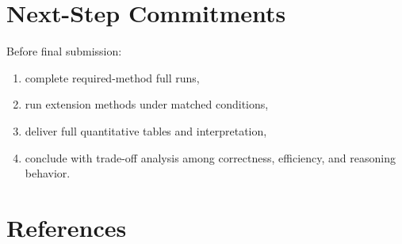 \documentclass[11pt]{article}
\begin{document}
\section{Next-Step Commitments}

Before final submission:
\begin{enumerate}[leftmargin=*]
    \item complete required-method full runs,
    \item run extension methods under matched conditions,
    \item deliver full quantitative tables and interpretation,
    \item conclude with trade-off analysis among correctness, efficiency, and reasoning behavior.
\end{enumerate}

\section{References}
\end{document}
